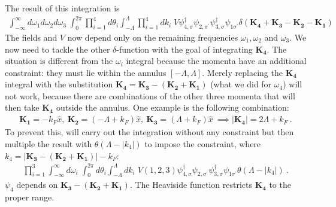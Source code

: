 \documentclass[12pt]{article}
\begin{document}
The result of this integration is
\begin{equation}\begin{aligned}
	\int_{-\infty}^\infty d\omega_1 d\omega_2 d\omega_3\;\int_0^{2\pi} \prod_{i=1}^4 d \theta_i \int_{-\Lambda}^{\Lambda}\prod_{i=1}^4 dk_i \;V\psi_{4,\sigma}^\dagger\psi_{2,\sigma^\prime}\psi_{3,\sigma}^\dagger\psi_{1\sigma^\prime} \delta(\mathbf{K_4}+\mathbf{K_3} - \mathbf{K_2} - \mathbf{K_1})
\end{aligned}\end{equation}
The fields and \(V\) now depend only on the remaining frequencies \(\omega_1,\omega_2\) and \(\omega_3\). We now need to tackle the other \(\delta\)-function with the goal of integrating \(\mathbf{K_4}\). The situation is different from the \(\omega_i\) integral because the momenta have an additional constraint: they must lie within the annulus \(\left[-\Lambda,\Lambda\right]\). Merely replacing the \(\mathbf{K_4}\) integral with the substitution \(\mathbf{K_4} = \mathbf{K_3} - (\mathbf{K_2} + \mathbf{K_1})\) (what we did for \(\omega_4\)) will not work, because there are combinations of the other three momenta that will then take \(\mathbf{K_4}\) outside the annulus. One example is the following combination:
\begin{equation}\begin{aligned}
	\mathbf{K_1} = -k_F \hat x,~\mathbf{K_2} = \left(-\Lambda + k_F\right)\hat x,~\mathbf{K_3} = \left( \Lambda + k_F \right) \hat x~\implies |\mathbf{K_4}| = 2\Lambda + k_F~.
\end{aligned}\end{equation}
To prevent this, will carry out the integration without any constraint but then multiple the result with \(\theta(\Lambda - |k_4|)\) to impose the constraint, where \(k_4 = |\mathbf{K_3} - (\mathbf{K_2} + \mathbf{K_1})| - k_F\):
\begin{equation}\begin{aligned}
	\prod_{i=1}^3\int_{-\infty}^\infty d\omega_i\;\int_0^{2\pi} d\theta_i \int_{-\Lambda}^{\Lambda}dk_i \;V(1,2,3)\psi_{4,\sigma}^\dagger\psi_{2,\sigma^\prime}\psi_{3,\sigma}^\dagger\psi_{1\sigma^\prime}\theta(\Lambda - |k_4|)~.
\end{aligned}\end{equation}
\(\psi_{4}\) depends on \(\mathbf{K_3} - (\mathbf{K_2} + \mathbf{K_1})\). The Heaviside function restricts \(\mathbf{K_4}\) to the proper range.
\end{document}
